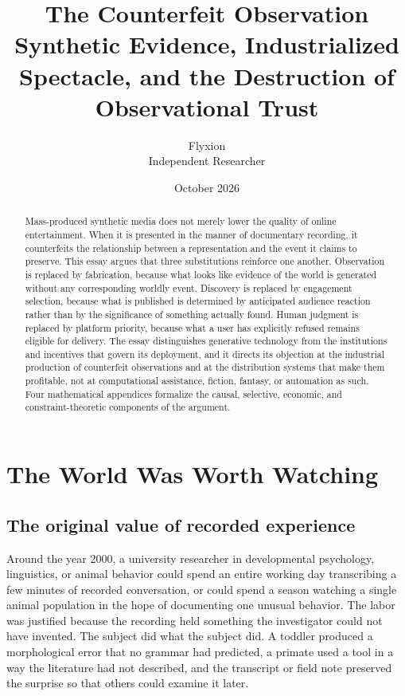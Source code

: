 \documentclass[12pt]{article}
\title{The Counterfeit Observation\\[0.4em]
\large Synthetic Evidence, Industrialized Spectacle, and the Destruction of Observational Trust}
\author{Flyxion\\Independent Researcher}
\date{October 2026}
\theoremstyle{plain}
\theoremstyle{definition}
\theoremstyle{remark}
\begin{document}
\maketitle

\begin{abstract}
\noindent
Mass-produced synthetic media does not merely lower the quality of online entertainment. When it is presented in the manner of documentary recording, it counterfeits the relationship between a representation and the event it claims to preserve. This essay argues that three substitutions reinforce one another. Observation is replaced by fabrication, because what looks like evidence of the world is generated without any corresponding worldly event. Discovery is replaced by engagement selection, because what is published is determined by anticipated audience reaction rather than by the significance of something actually found. Human judgment is replaced by platform priority, because what a user has explicitly refused remains eligible for delivery. The essay distinguishes generative technology from the institutions and incentives that govern its deployment, and it directs its objection at the industrial production of counterfeit observations and at the distribution systems that make them profitable, not at computational assistance, fiction, fantasy, or automation as such. Four mathematical appendices formalize the causal, selective, economic, and constraint-theoretic components of the argument.
\end{abstract}

\section{The World Was Worth Watching}

\subsection{The original value of recorded experience}

Around the year 2000, a university researcher in developmental psychology, linguistics, or animal behavior could spend an entire working day transcribing a few minutes of recorded conversation, or could spend a season watching a single animal population in the hope of documenting one unusual behavior. The labor was justified because the recording held something the investigator could not have invented. The subject did what the subject did. A toddler produced a morphological error that no grammar had predicted, a primate used a tool in a way the literature had not described, and the transcript or field note preserved the surprise so that others could examine it later.
\end{document}
